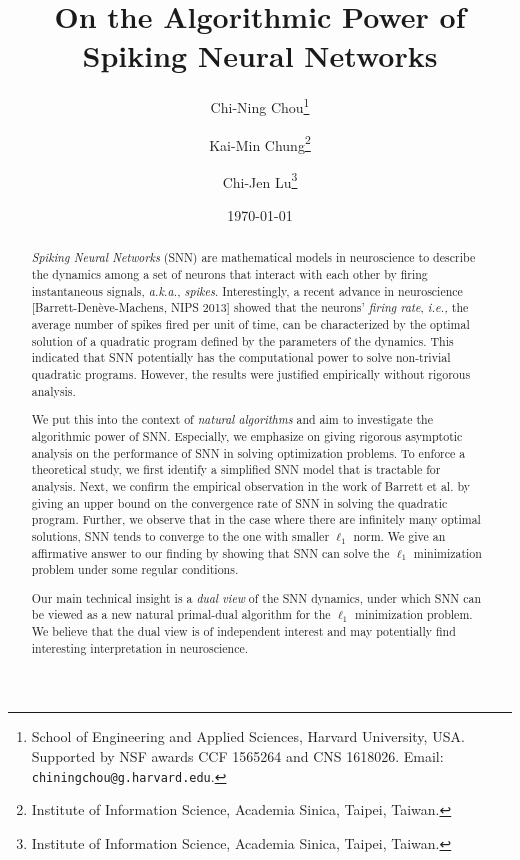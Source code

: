 \documentclass[11pt]{article}
\title{On the Algorithmic Power of Spiking Neural Networks}
\author{Chi-Ning Chou\thanks{School of Engineering and Applied Sciences, Harvard University, USA. Supported by NSF awards CCF 1565264 and CNS 1618026. Email: \texttt{chiningchou@g.harvard.edu}.}}
\author{Kai-Min Chung\thanks{Institute of Information Science, Academia Sinica, Taipei, Taiwan.}}
\author{Chi-Jen Lu\thanks{Institute of Information Science, Academia Sinica, Taipei, Taiwan.}}
\affil[]{}
\date{\today} %
\theoremstyle{remark}
\theoremstyle{definition}
\begin{document}
	
\maketitle

\begin{abstract}
\emph{Spiking Neural Networks} (SNN) are mathematical models in neuroscience to describe the dynamics among a set of neurons that interact with each other by firing instantaneous signals, \emph{a.k.a.}, \emph{spikes}. 
Interestingly, a recent advance in neuroscience [Barrett-Den\`{e}ve-Machens, NIPS 2013] showed that the neurons' \emph{firing rate}, \emph{i.e.,} the average number of spikes fired per unit of time, can be characterized by the optimal solution of a quadratic program defined by the parameters of the dynamics. This indicated that SNN potentially has the computational power to solve non-trivial quadratic programs. However, the results were justified empirically without rigorous analysis. 

We put this into the context of \emph{natural algorithms} and aim to investigate the algorithmic power of SNN. Especially, we emphasize on giving rigorous asymptotic analysis on the performance of SNN in solving optimization problems. To enforce a theoretical study, we first identify a simplified SNN model that is tractable for analysis. Next, we confirm the empirical observation in the work of Barrett et al. by giving an upper bound on the convergence rate of SNN in solving the quadratic program. Further, we observe that in the case where there are infinitely many optimal solutions, SNN tends to converge to the one with smaller $\ell_1$ norm. We give an affirmative answer to our finding by showing that SNN can solve the $\ell_1$ minimization problem under some regular conditions.

Our main technical insight is a \emph{dual view} of the SNN dynamics, under which SNN can be viewed as a new natural primal-dual algorithm for the $\ell_1$ minimization problem. We believe that the dual view is of independent interest and may potentially find interesting interpretation in neuroscience. 
\end{abstract}

\vspace{10pt} 
	
\end{document}
